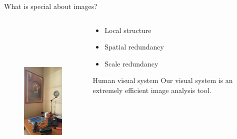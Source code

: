 \documentclass[xcolor=pdftex,dvipsnames,table,mathserif]{beamer}
\begin{document}
\begin{frame}{What is special about images?}

  \begin{columns}
    \begin{column}{.5\textwidth}
      \begin{figure}[ht]
        \centering
        \includegraphics[height=8cm]{bureau-1}
      \end{figure}

    \end{column}
    \begin{column}{.5\textwidth}
      \begin{itemize}
      \item Local structure
      \item Spatial redundancy
      \item Scale redundancy \cite{glasner_super-resolution_2009}
      \end{itemize}

      \pause

      \begin{block}{Human visual system}
      Our visual system is an extremely efficient image analysis tool.
      \end{block}

    \end{column}

  \end{columns}

\end{frame}
\end{document}
